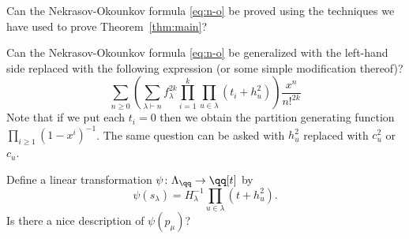 \documentclass[12pt]{article}
\theoremstyle{definition}
\theoremstyle{remark}
\begin{document}
\be
 \item  Can the Nekrasov-Okounkov formula \eqref{eq:n-o} be
proved using the techniques we have used to prove
Theorem~\ref{thm:main}? 
 \item Can the Nekrasov-Okounkov formula \eqref{eq:n-o} be generalized
with the left-hand side replaced with the following expression (or
some simple modification thereof)? 
  $$  \sum_{n\geq 0}\left(\sum_{\lambda\vdash n}f_\lambda^{2k} 
   \prod_{i=1}^k\prod_{u\in\lambda} (t_i+h_u^2)
 \right)\frac{x^n}{n!^{2k}} $$ 
Note that if we put each $t_i=0$ then we obtain the partition
generating function $\prod_{i\geq 1}(1-x^i)^{-1}$. The same question can
be asked with $h_u^2$ replaced with $c_u^2$ or $c_u$.
 \item Define a linear transformation $\psi\colon \Lambda_\qq
   \rightarrow \qq[t]$ by
  $$ \psi(s_\lambda) = H_\lambda^{-1}\prod_{u\in\lambda}(t+h_u^2). $$
Is there a nice description of $\psi(p_\mu)$?
\ee
\end{document}
